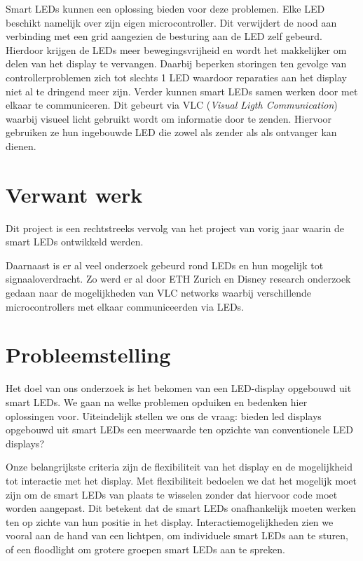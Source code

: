 \documentclass{article}
\begin{document}
Smart LEDs kunnen een oplossing bieden voor deze problemen. Elke LED beschikt namelijk over zijn eigen microcontroller. Dit verwijdert de nood aan verbinding met een grid aangezien de besturing aan de LED zelf gebeurd. Hierdoor krijgen de LEDs meer bewegingsvrijheid en wordt het makkelijker om delen van het display te vervangen. Daarbij beperken storingen ten gevolge van controllerproblemen zich tot slechts 1 LED waardoor reparaties aan het display niet al te dringend meer zijn.  Verder kunnen smart LEDs samen werken door met elkaar te communiceren. Dit gebeurt via VLC (\textit{Visual Ligth Communication}) waarbij visueel licht gebruikt wordt om informatie door te zenden\cite{VLC}. Hiervoor gebruiken ze hun ingebouwde LED die zowel als zender als als ontvanger kan dienen. 


\section{Verwant werk}
Dit project is een rechtstreeks vervolg van het project van vorig jaar waarin de smart LEDs ontwikkeld werden. 

Daarnaast is er al veel onderzoek gebeurd rond LEDs en hun mogelijk tot signaaloverdracht. Zo werd er al door ETH Zurich en Disney research onderzoek gedaan naar de mogelijkheden van VLC networks waarbij verschillende microcontrollers met elkaar communiceerden via LEDs\cite{VLCNetworks}.


\section{Probleemstelling}

Het doel van ons onderzoek is het bekomen van een LED-display opgebouwd uit smart LEDs. We gaan na welke problemen opduiken en bedenken hier oplossingen voor. Uiteindelijk stellen we ons de vraag: bieden led displays opgebouwd uit smart LEDs een meerwaarde ten opzichte van conventionele LED displays?

Onze belangrijkste criteria zijn de flexibiliteit van het display en de mogelijkheid tot interactie met het display. Met flexibiliteit bedoelen we dat het mogelijk moet zijn om de smart LEDs van plaats te wisselen zonder dat hiervoor code moet worden aangepast. Dit betekent dat de smart LEDs onafhankelijk moeten werken ten op zichte van hun positie in het display. Interactiemogelijkheden zien we vooral aan de hand van een lichtpen, om individuele smart LEDs aan te sturen, of een floodlight om grotere groepen smart LEDs aan te spreken.
\end{document}
